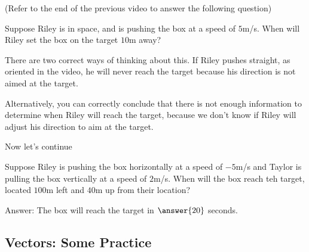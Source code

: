 \documentclass{ximera}
\begin{document}
\begin{problem}
    (Refer to the end of the previous video to answer the following question)
    
    Suppose Riley is in space, and is pushing the box at a speed of $5$m/s. When will Riley set the box on the target $10$m away?
        \begin{multipleChoice}
        \end{multipleChoice}
    \begin{feedback}
        There are two correct ways of thinking about this. If Riley pushes straight, as oriented in the video, he will never reach the target because his direction is not aimed at the target. 

        Alternatively, you can correctly conclude that there is not enough information to determine when Riley will reach the target, because we don't know if Riley will adjust his direction to aim at the target.
    \end{feedback}
\end{problem}

    Now let's continue

\begin{center}
\end{center}

\begin{problem}
    Suppose Riley is pushing the box horizontally at a speed of $-5$m/s and Taylor is pulling the box vertically at a speed of $2$m/s. When will the box reach teh target, located $100$m left and $40$m up from their location?

    Answer: The box will reach the target in $\answer{20}$ seconds.

    \begin{feedback}
    \begin{center}
    \end{center}
    \end{feedback}

\end{problem}

\subsection*{Vectors: Some Practice}
\end{document}
